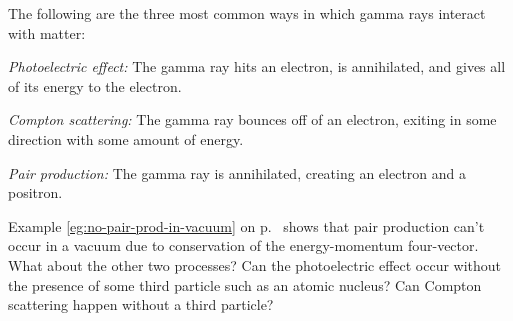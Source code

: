 The following are the three most common ways in which gamma rays interact with matter:

\emph{Photoelectric effect:} The gamma ray hits an electron, is annihilated, and gives all of its energy to the electron.

\emph{Compton scattering:} The gamma ray bounces off of an electron,
exiting in some direction with some amount of energy.

\emph{Pair production:} The gamma ray is annihilated, creating an
electron and a positron.

\noindent Example \ref{eg:no-pair-prod-in-vacuum} on p.~\pageref{eg:no-pair-prod-in-vacuum} shows
that pair production can't occur in a vacuum due to conservation of the energy-momentum
four-vector. What about the other two processes? Can the photoelectric effect occur without the
presence of some third particle such as an atomic nucleus? Can Compton scattering happen
without a third particle?
